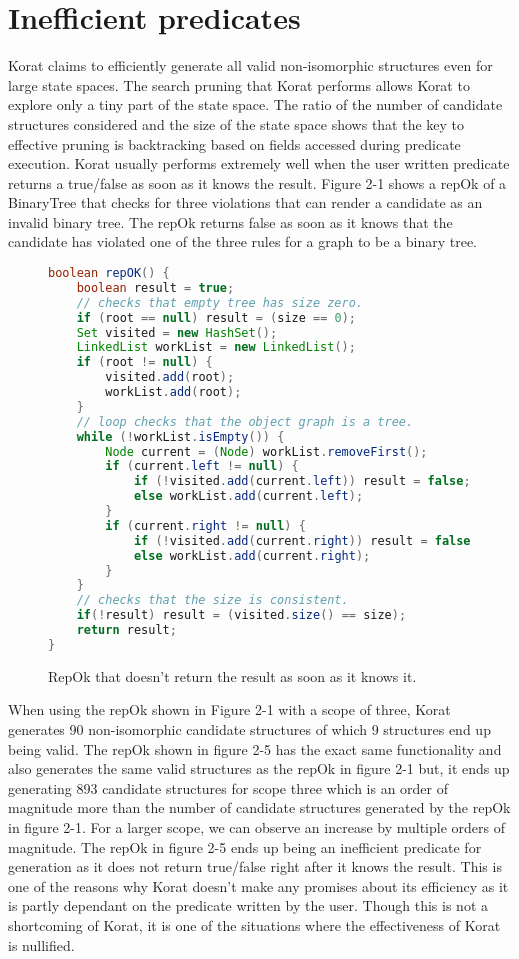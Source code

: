 \section{Inefficient predicates}
Korat claims to efficiently generate all valid non-isomorphic structures even for large state spaces. The search pruning that Korat performs allows Korat to explore only a tiny part of the state space. The ratio of the number of candidate structures considered and the size of the state space shows that the key to effective pruning is backtracking based on fields accessed during predicate execution. Korat usually performs extremely well when the user written predicate returns a true/false as soon as it knows the result. Figure 2-1 shows a repOk of a BinaryTree that checks for three violations that can render a candidate as an invalid binary tree. The repOk returns false as soon as it knows that the candidate has violated one of the three rules for a graph to be a binary tree.

\begin{figure}
\centering
\begin{lstlisting}[language=Java]
boolean repOK() {
    boolean result = true;
    // checks that empty tree has size zero.
    if (root == null) result = (size == 0);
    Set visited = new HashSet();
    LinkedList workList = new LinkedList();
    if (root != null) {
        visited.add(root);
        workList.add(root);
    }
    // loop checks that the object graph is a tree.
    while (!workList.isEmpty()) {
        Node current = (Node) workList.removeFirst();
        if (current.left != null) {
            if (!visited.add(current.left)) result = false;
            else workList.add(current.left);
        }
        if (current.right != null) {
            if (!visited.add(current.right)) result = false;
            else workList.add(current.right);
        }
    }
    // checks that the size is consistent.
    if(!result) result = (visited.size() == size);
    return result;
}
\end{lstlisting}
\caption{RepOk that doesn’t return the result as soon as it knows it.}
\label{fig:bTreeInefficient}
\end{figure}

\par
When using the repOk shown in Figure 2-1 with a scope of three, Korat generates 90 non-isomorphic candidate structures of which 9 structures end up being valid. The repOk shown in figure 2-5 has the exact same functionality and also generates the same valid structures as the repOk in figure 2-1 but, it ends up generating 893 candidate structures for scope three which is an order of magnitude more than the number of candidate structures generated by the repOk in figure 2-1. For a larger scope, we can observe an increase by multiple orders of magnitude. The repOk in figure 2-5 ends up being an inefficient predicate for generation as it does not return true/false right after it knows the result. This is one of the reasons why Korat doesn’t make any promises about its efficiency as it is partly dependant on the predicate written by the user. Though this is not a shortcoming of Korat, it is one of the situations where the effectiveness of Korat is nullified.
